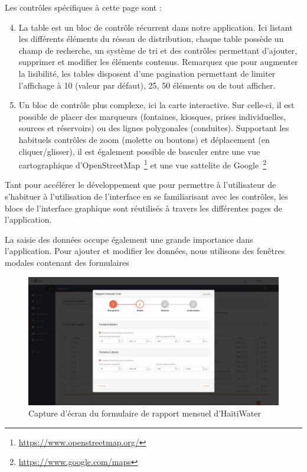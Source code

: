 \documentclass{EPL-master-thesis-covers-FR}
\begin{document}
			Les contrôles spécifiques à cette page sont :
			\begin{enumerate}\setcounter{enumi}{3} %
				\item La table est un bloc de contrôle récurrent dans notre application. Ici listant les différents éléments du réseau de distribution, chaque table possède un champ de recherche, un système de tri et des contrôles permettant d'ajouter, supprimer et modifier les éléments contenus. Remarquez que pour augmenter la lisibilité, les tables disposent d'une pagination permettant de limiter l'affichage à 10 (valeur par défaut), 25, 50 éléments ou de tout afficher.
				\item Un bloc de contrôle plus complexe, ici la carte interactive. Sur celle-ci, il est possible de placer des marqueurs (fontaines, kiosques, prises individuelles, sources et réservoirs) ou des lignes polygonales (conduites). Supportant les habituels contrôles de zoom (molette ou boutons) et déplacement (en cliquer/glisser), il est également possible de basculer entre une vue cartographique d'OpenStreetMap~\footnote{\url{https://www.openstreetmap.org/}} et une vue sattelite de Google~\footnote{\url{https://www.google.com/maps}}
			\end{enumerate}

			Tant pour accélérer le développement que pour permettre à l'utilisateur de s'habituer à l'utilisation de l'interface en se familiarisant avec les contrôles, les blocs de l'interface graphique sont réutilisés à travers les différentes pages de l'application.

			La saisie des données occupe également une grande importance dans l'application. Pour ajouter et modifier les données, nous utilisons des fenêtres modales contenant des formulaires

			\begin{figure}[H]
				\includegraphics[width=\textwidth]{images/screen_rapport_mensuel.png}
				\caption{Capture d'écran du formulaire de rapport mensuel d'HaïtiWater}
				\label{fig:screen_rapport_mensuel}
			\end{figure}
\end{document}
